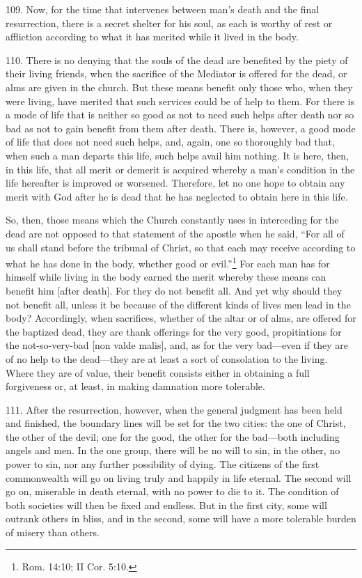 
109. Now, for the time that intervenes between man's death and the final resurrection, there is a secret shelter for his soul, as each is worthy of rest or affliction according to what it has merited while it lived in the body.

110. There is no denying that the souls of the dead are benefited by the piety of their living friends, when the sacrifice of the Mediator is offered for the dead, or alms are given in the church. But these means benefit only those who, when they were living, have merited that such services could be of help to them. For there is a mode of life that is neither so good as not to need such helps after death nor so bad as not to gain benefit from them after death. There is, however, a good mode of life that does not need such helps, and, again, one so thoroughly bad that, when such a man departs this life, such helps avail him nothing. It is here, then, in this life, that all merit or demerit is acquired whereby a man's condition in the life hereafter is improved or worsened. Therefore, let no one hope to obtain any merit with God after he is dead that he has neglected to obtain here in this life.

So, then, those means which the Church constantly uses in interceding for the dead are not opposed to that statement of the apostle when he said, ``For all of us shall stand before the tribunal of Christ, so that each may receive according to what he has done in the body, whether good or evil.''\footnote{Rom. 14:10; II Cor. 5:10.} For each man has for himself while living in the body earned the merit whereby these means can benefit him [after death]. For they do not benefit all. And yet why should they not benefit all, unless it be because of the different kinds of lives men lead in the body? Accordingly, when sacrifices, whether of the altar or of alms, are offered for the baptized dead, they are thank offerings for the very good, propitiations for the not-so-very-bad [non valde malis], and, as for the very bad—even if they are of no help to the dead—they are at least a sort of consolation to the living. Where they are of value, their benefit consists either in obtaining a full forgiveness or, at least, in making damnation more tolerable.

111. After the resurrection, however, when the general judgment has been held and finished, the boundary lines will be set for the two cities: the one of Christ, the other of the devil; one for the good, the other for the bad—both including angels and men. In the one group, there will be no will to sin, in the other, no power to sin, nor any further possibility of dying. The citizens of the first commonwealth will go on living truly and happily in life eternal. The second will go on, miserable in death eternal, with no power to die to it. The condition of both societies will then be fixed and endless. But in the first city, some will outrank others in bliss, and in the second, some will have a more tolerable burden of misery than others.

